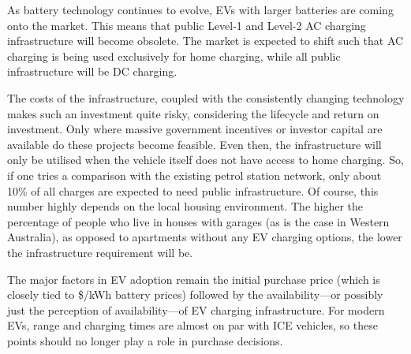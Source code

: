 As battery technology continues to evolve, EVs with larger batteries are coming onto the market. This means that public Level-1 and Level-2 AC charging infrastructure will become obsolete. The market is expected to shift such that AC charging is being used exclusively for home charging, while all public infrastructure will be DC charging.

The costs of the infrastructure, coupled with the consistently changing technology makes such an investment quite risky, considering the lifecycle and return on investment. Only where massive government incentives or investor capital are available do these projects become feasible. Even then, the infrastructure will only be utilised when the vehicle itself does not have access to home charging. So, if one tries a comparison with the existing petrol station network, only about 10\% of all charges are expected to need public infrastructure. Of course, this number highly depends on the local housing environment. The higher the percentage of people who live in houses with garages (as is the case in Western Australia), as opposed to apartments without any EV charging options, the lower the infrastructure requirement will be.

The major factors in EV adoption remain the initial purchase price (which is closely tied to \$/kWh battery prices) followed by the availability---or possibly just the perception of availability---of EV charging infrastructure. For modern EVs, range and charging times are almost on par with ICE vehicles, so these points should no longer play a role in purchase decisions.

